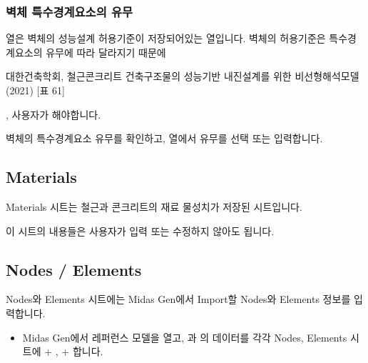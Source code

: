 \documentclass[a4paper,10pt,korean]{sphinxmanual}
\begin{document}
\subsubsection{벽체 특수경계요소의 유무}
\label{\detokenize{2_etc:id3}}
\sphinxAtStartPar
{}열은 벽체의 성능설계 허용기준이 저장되어있는 열입니다.
벽체의 허용기준은 특수경계요소의 유무에 따라 달라지기 때문에%
\begin{footnote}[1]\sphinxAtStartFootnote
대한건축학회, 철근콘크리트 건축구조물의 성능기반 내진설계를 위한 비선형해석모델(2021) {[}표 6\sphinxhyphen{}1{]}
%
\end{footnote}, 사용자가 해야합니다.

\begin{sphinxShadowBox}

\sphinxAtStartPar
벽체의 특수경계요소 유무를 확인하고, 열에서 유무를 선택 또는 입력합니다.

\begin{center}
\noindent{}
\end{center}
\end{sphinxShadowBox}

\sphinxstepscope


\subsection{Materials}
\label{\detokenize{2_materials:materials}}\label{\detokenize{2_materials::doc}}
\sphinxAtStartPar
Materials 시트는 철근과 콘크리트의 재료 물성치가 저장된 시트입니다.

\sphinxAtStartPar
이 시트의 내용들은 사용자가 입력 또는 수정하지 않아도 됩니다.

\sphinxstepscope


\subsection{Nodes / Elements}
\label{\detokenize{2_nodes_elements:nodes-elements}}\label{\detokenize{2_nodes_elements::doc}}
\sphinxAtStartPar
Nodes와 Elements 시트에는 Midas Gen에서 Import할 Nodes와 Elements 정보를 입력합니다.

\begin{sphinxShadowBox}
\begin{itemize}
\item {} 
\sphinxAtStartPar
Midas Gen에서 레퍼런스 모델을 열고, 과 의
데이터를 각각 Nodes, Elements 시트에 + , + 합니다.

\begin{center}
\noindent{}
\end{center}

\end{itemize}
\end{sphinxShadowBox}
\end{document}
